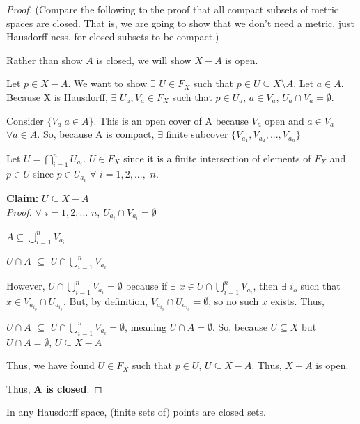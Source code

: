 \begin{proof} (Compare the following to the proof that all compact subsets of metric spaces are closed. That is, we are going to show that we don't need a metric, just Hausdorff-ness, for closed subsets to be compact.)

     Rather than show $A$ is closed, we will show $X-A$ is open.
     
     Let $p \in X-A$. We want to show $\exists$ $U \in F_X$ such that $p \in U \subseteq X\setminus A$.  Let $a \in A$. Because X is Hausdorff, $\exists$ $U_a, V_a \in F_X$ such that $p \in U_a$, $a \in V_a$, $U_a \cap V_a = \emptyset$.

     Consider $\{ V_a | a \in A\}$. This is an open cover of A because $V_a$ open and $a \in V_a$ $\forall a \in A$. So, because A is compact, $\exists$ finite subcover $\{ V_{a_1}, V_{a_2}, ..., V_{a_n}\}$

     Let $U = \bigcap_{i=1}^{n} U_{a_i}$. $U \in F_X$ since it is a finite intersection of elements of $F_X$ and $p \in U$ since $p \in U_{a_i}$ $\forall$ $i=1, 2, ...,$ $n$.

     \textbf{Claim:} $U \subseteq X-A$\\
     \emph{Proof.} $\forall$ $i=1, 2, ...$ $n$, $U_{a_i} \cap V_{a_i} = \emptyset$
     
     $A \subseteq \bigcup_{i=1}^{n} V_{a_i}$
     
     $U \cap A$ $\subseteq$ $U \cap \bigcup_{i=1}^{n} V_{a_i}$
     
     However, $U \cap \bigcup_{i=1}^{n} V_{a_i} = \emptyset$ because if $\exists$ $x \in U \cap \bigcup_{i=1}^{n} V_{a_i}$, then $\exists$ $i_o$ such that $x \in V_{a_{i_o}} \cap U_{a_{i_o}}$. But, by definition, $V_{a_{i_o}} \cap U_{a_{i_o}} = \emptyset$, so no such $x$ exists. Thus,
     
     $U  \cap A$ $\subseteq$ $U \cap \bigcup_{i=1}^{n} V_{a_i} = \emptyset$, meaning $U \cap A = \emptyset$. So, because $U \subseteq X$ but $U \cap A = \emptyset$, $U \subseteq X-A$
     
     Thus, we have found $U \in F_X$ such that $p \in U$, $U \subseteq X-A$. Thus, $X-A$ is open.
     
     Thus, \textbf{A is closed}.
     \end{proof}
     
\begin{corollary}
 In any Hausdorff space, (finite sets of) points are closed sets.
 \end{corollary}
 
